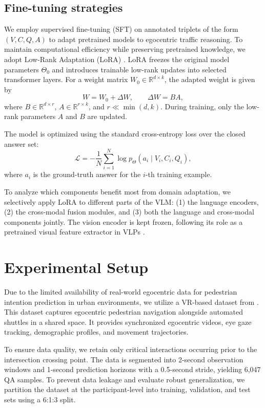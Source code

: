 \documentclass[letterpaper, 10pt, journal]{IEEEtran}  %
\begin{document}
\subsection{Fine-tuning strategies}
We employ supervised fine-tuning (SFT) on annotated triplets of the form $(V, C, Q, A)$ to adapt pretrained models to egocentric traffic reasoning. 
To maintain computational efficiency while preserving pretrained knowledge, we adopt Low-Rank Adaptation (LoRA) \cite{hu_lora_2021}. LoRA freezes the original model parameters $\Theta_0$ and introduces trainable low-rank updates into selected transformer layers. For a weight matrix $W_0 \in \mathbb{R}^{d \times k}$, the adapted weight is given by
\begin{equation}
    W = W_0 + \Delta W, \qquad \Delta W = BA,
\end{equation}
where $B \in \mathbb{R}^{d \times r}$, $A \in \mathbb{R}^{r \times k}$, and $r \ll \min(d,k)$. During training, only the low-rank parameters $A$ and $B$ are updated.

The model is optimized using the standard cross-entropy loss over the closed answer set:
\begin{equation}
    \mathcal{L}
    = - \frac{1}{N} \sum_{i=1}^{N}
    \log p_{\Theta}(a_i \mid V_i, C_i, Q_i),
\end{equation}
where $a_i$ is the ground-truth answer for the $i$-th training example.

To analyze which components benefit most from domain adaptation, we selectively apply LoRA to different parts of the VLM: (1) the language encoders, (2) the cross-modal fusion modules, and (3) both the language and cross-modal components jointly. The vision encoder is kept frozen, following its role as a pretrained visual feature extractor in VLPs \cite{di_grounded_2024}.


\section{Experimental Setup}
\label{sec:experimental_setup}

Due to the limited availability of real-world egocentric data for pedestrian intention prediction in urban environments, we utilize a VR-based dataset from \cite{li2026eye}. This dataset captures egocentric pedestrian navigation alongside automated shuttles in a shared space. It provides synchronized egocentric videos, eye gaze tracking, demographic profiles, and movement trajectories.


To ensure data quality, we retain only critical interactions occurring prior to the intersection crossing point.
The data is segmented into 2-second observation windows and 1-second prediction horizons with a 0.5-second stride, yielding 6,047 QA samples.
To prevent data leakage and evaluate robust generalization, we partition the dataset at the participant-level into training, validation, and test sets using a 6:1:3 split.
\end{document}
